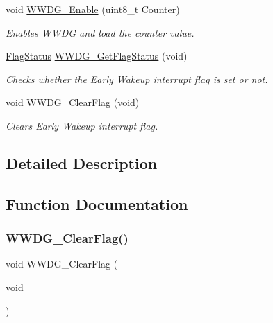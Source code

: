 \begin{DoxyCompactItemize}
void \mbox{\hyperlink{group___w_w_d_g___exported___functions_ga10dc2554d0b504b5472e3ecf0f02a9e6}{W\+W\+D\+G\+\_\+\+Enable}} (uint8\+\_\+t Counter)
\begin{DoxyCompactList}\small\item\em Enables W\+W\+DG and load the counter value. \end{DoxyCompactList}\item 
\mbox{\hyperlink{group___exported__types_ga89136caac2e14c55151f527ac02daaff}{Flag\+Status}} \mbox{\hyperlink{group___w_w_d_g___exported___functions_ga7df4882d45918b9b8249dfca1e44fabc}{W\+W\+D\+G\+\_\+\+Get\+Flag\+Status}} (void)
\begin{DoxyCompactList}\small\item\em Checks whether the Early Wakeup interrupt flag is set or not. \end{DoxyCompactList}\item 
void \mbox{\hyperlink{group___w_w_d_g___exported___functions_gabd2b5a6317c2e1a3ab0795838ce59dd2}{W\+W\+D\+G\+\_\+\+Clear\+Flag}} (void)
\begin{DoxyCompactList}\small\item\em Clears Early Wakeup interrupt flag. \end{DoxyCompactList}\end{DoxyCompactItemize}


\subsection{Detailed Description}


\subsection{Function Documentation}
\mbox{\label{group___w_w_d_g___exported___functions_gabd2b5a6317c2e1a3ab0795838ce59dd2}} 
\subsubsection{\texorpdfstring{WWDG\_ClearFlag()}{WWDG\_ClearFlag()}}
{\footnotesize\ttfamily void W\+W\+D\+G\+\_\+\+Clear\+Flag (\begin{DoxyParamCaption}\item[{void}]{ }\end{DoxyParamCaption})}



